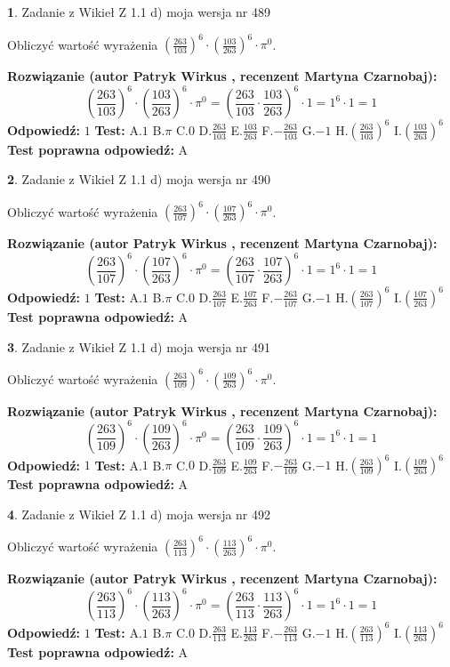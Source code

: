 \documentclass[12pt, a4paper]{article}
\theoremstyle{definition} %
\newtheorem{zad}{}
\newcommand{\zadStart}[1]{\begin{zad}#1\newline}
\newcommand{\zadStop}{\end{zad}}
\newcommand{\rozwStart}[2]{\noindent \textbf{Rozwiązanie (autor #1 , recenzent #2): }\newline}
\newcommand{\rozwStop}{\newline}
\newcommand{\odpStart}{\noindent \textbf{Odpowiedź:}\newline}
\newcommand{\odpStop}{\newline}
\newcommand{\testStart}{\noindent \textbf{Test:}\newline}
\newcommand{\testStop}{\newline}
\newcommand{\kluczStart}{\noindent \textbf{Test poprawna odpowiedź:}\newline}
\newcommand{\kluczStop}{\newline}
\begin{document}
\zadStart{Zadanie z Wikieł Z 1.1 d) moja wersja nr 489}

Obliczyć wartość wyrażenia $(\frac{263}{103})^{6} \cdot (\frac{103}{263})^{6} \cdot \pi^{0}$.
\zadStop
\rozwStart{Patryk Wirkus}{Martyna Czarnobaj}
$$(\frac{263}{103})^{6} \cdot (\frac{103}{263})^{6} \cdot \pi^{0} = (\frac{263}{103} \cdot \frac{103}{263})^{6} \cdot 1 = 1^{6} \cdot 1 = 1$$
\rozwStop
\odpStart
$1$
\odpStop
\testStart
A.$1$ B.$\pi$ C.$0$ D.$\frac{263}{103}$ E.$\frac{103}{263}$
F.$-\frac{263}{103}$ G.$-1$
H.$(\frac{263}{103})^{6}$
I.$(\frac{103}{263})^{6}$
\testStop
\kluczStart
A
\kluczStop



\zadStart{Zadanie z Wikieł Z 1.1 d) moja wersja nr 490}

Obliczyć wartość wyrażenia $(\frac{263}{107})^{6} \cdot (\frac{107}{263})^{6} \cdot \pi^{0}$.
\zadStop
\rozwStart{Patryk Wirkus}{Martyna Czarnobaj}
$$(\frac{263}{107})^{6} \cdot (\frac{107}{263})^{6} \cdot \pi^{0} = (\frac{263}{107} \cdot \frac{107}{263})^{6} \cdot 1 = 1^{6} \cdot 1 = 1$$
\rozwStop
\odpStart
$1$
\odpStop
\testStart
A.$1$ B.$\pi$ C.$0$ D.$\frac{263}{107}$ E.$\frac{107}{263}$
F.$-\frac{263}{107}$ G.$-1$
H.$(\frac{263}{107})^{6}$
I.$(\frac{107}{263})^{6}$
\testStop
\kluczStart
A
\kluczStop



\zadStart{Zadanie z Wikieł Z 1.1 d) moja wersja nr 491}

Obliczyć wartość wyrażenia $(\frac{263}{109})^{6} \cdot (\frac{109}{263})^{6} \cdot \pi^{0}$.
\zadStop
\rozwStart{Patryk Wirkus}{Martyna Czarnobaj}
$$(\frac{263}{109})^{6} \cdot (\frac{109}{263})^{6} \cdot \pi^{0} = (\frac{263}{109} \cdot \frac{109}{263})^{6} \cdot 1 = 1^{6} \cdot 1 = 1$$
\rozwStop
\odpStart
$1$
\odpStop
\testStart
A.$1$ B.$\pi$ C.$0$ D.$\frac{263}{109}$ E.$\frac{109}{263}$
F.$-\frac{263}{109}$ G.$-1$
H.$(\frac{263}{109})^{6}$
I.$(\frac{109}{263})^{6}$
\testStop
\kluczStart
A
\kluczStop



\zadStart{Zadanie z Wikieł Z 1.1 d) moja wersja nr 492}

Obliczyć wartość wyrażenia $(\frac{263}{113})^{6} \cdot (\frac{113}{263})^{6} \cdot \pi^{0}$.
\zadStop
\rozwStart{Patryk Wirkus}{Martyna Czarnobaj}
$$(\frac{263}{113})^{6} \cdot (\frac{113}{263})^{6} \cdot \pi^{0} = (\frac{263}{113} \cdot \frac{113}{263})^{6} \cdot 1 = 1^{6} \cdot 1 = 1$$
\rozwStop
\odpStart
$1$
\odpStop
\testStart
A.$1$ B.$\pi$ C.$0$ D.$\frac{263}{113}$ E.$\frac{113}{263}$
F.$-\frac{263}{113}$ G.$-1$
H.$(\frac{263}{113})^{6}$
I.$(\frac{113}{263})^{6}$
\testStop
\kluczStart
A
\kluczStop
\end{document}
